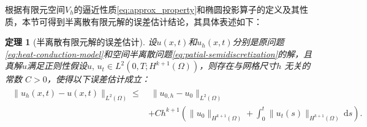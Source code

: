\documentclass{GZUbachelorthesis}
\theoremstyle{chineseplain}
\newtheorem{theorem}{定理}[section]
\begin{document}
根据有限元空间$V_h$的逼近性质\eqref{eq:approx_property}和椭圆投影算子的定义及其性质，本节可得到半离散有限元解的误差估计结论，其具体表述如下：
\begin{theorem}[半离散有限元解的误差估计]
设$u(x,t)$和$u_h(x,t)$分别是原问题\eqref{eq:heat-conduction-model}和空间半离散问题\eqref{eq:patial-semidiscretization}的解，且真解$u$满足正则性假设$u, \, u_t \in L^2(0,T; H^{k+1}(\Omega))$，则存在与网格尺寸$h$ 无关的常数 $C > 0$，使得以下误差估计成立：
\begin{align}
	\begin{split}
		\label{eq:corrected_error}
		\| u_h(x,t) - u(x,t) \|_{L^2(\Omega)}
		\leq &\; \| u_{0,h} - u_0 \|_{L^2(\Omega)} \\
		& + C h^{k+1} \left( \| u_0 \|_{H^{k+1}(\Omega)} + \int_0^t \| u_t(s) \|_{H^{k+1}(\Omega)} \, \mathrm{d}s \right).
	\end{split}
	\end{align}
\end{theorem}
\end{document}
